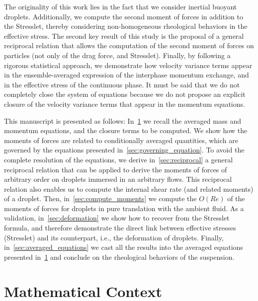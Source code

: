 The originality of this work lies in the fact that we consider inertial buoyant droplets. 
Additionally, we compute the second moment of forces in addition to the Stresslet, thereby considering non-homogeneous rheological behaviors in the effective stress. 
The second key result of this study is the proposal of a general reciprocal relation that allows the computation of the second moment of forces on particles (not only of the drag force, and Stresslet). 
Finally, by following a rigorous statistical approach, we demonstrate how velocity variance terms appear in the ensemble-averaged expression of the interphase momentum exchange, and in the effective stress of the continuous phase. 
It must be said that we do not completely close the system of equations because we do not propose an explicit closure of the velocity variance terms that appear in the momentum equations. 



This manuscript is presented as follows: 
In~\ref{sec:context} we recall the averaged mass and momentum equations, and the closure terms to be computed. 
We show how the moments of forces are related to conditionally averaged quantities, which are governed by the equations presented in~\ref{sec:governing_equation}. 
To avoid the complete resolution of the equations, we derive in~\ref{sec:reciprocal} a general reciprocal relation that can be applied to derive the moments of forces of arbitrary order on droplets immersed in an arbitrary flows. 
This reciprocal relation also enables us to compute the internal shear rate (and related moments) of a droplet. 
Then, in~\ref{sec:compute_moments} we compute the $O(Re)$ of the moments of forces for droplets in pure translation with the ambient fluid. 
As a validation, in~\ref{sec:deformation} we show how to recover \citet{taylor1964deformation} from the Stresslet formula, and therefore demonstrate the direct link between effective stresses (Stresslet) and its counterpart, i.e., the deformation of droplets. 
Finally, in~\ref{sec:averaged_equations} we cast all the results into the averaged equations presented in~\ref{sec:context} and conclude on the rheological behaviors of the suspension. 

\section{Mathematical Context}\label{sec:context}


